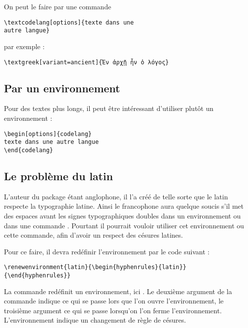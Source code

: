 On peut le faire par une commande 
\begin{verbatim}
\textcodelang[options]{texte dans une
autre langue}
\end{verbatim}

 par exemple : 

\begin{verbatim}
\textgreek[variant=ancient]{Ἐν ἀρχῇ ἦν ὁ λόγος}
\end{verbatim}

\subsection{Par un environnement}

Pour des textes plus longs, il peut être intéressant d'utiliser plutôt un environnement :

\begin{verbatim}
\begin[options]{codelang}
texte dans une autre langue
\end{codelang}
\end{verbatim}

\subsection{Le problème du latin}\label{redefinirlatin}

L'auteur du package  étant anglophone, il l'a créé de telle sorte que le latin respecte la typographie latine. Ainsi le francophone aura quelque soucis s'il met des espaces avant les signes typographiques doubles dans un environnement  ou dans une commande .
Pourtant il pourrait vouloir utiliser cet environnement ou cette commande, afin d'avoir un respect des césures latines.

Pour ce faire, il devra redéfinir l'environnement  par le code suivant :

\begin{verbatim}
\renewenvironment{latin}{\begin{hyphenrules}{latin}}{\end{hyphenrules}}
\end{verbatim}

\begin{anedocte}
La commande  redéfinit un environnement, ici . Le deuxième argument de la commande indique ce qui se passe lors que l'on ouvre l'environnement, le troisième argument ce qui se passe lorsqu'on l'on ferme l'environnement. L'environnement  indique un changement de règle de césures.
\end{anedocte}


